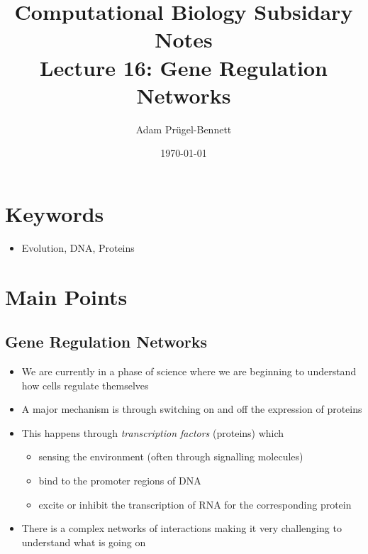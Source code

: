\documentclass[11pt]{article}
\author{Adam Prügel-Bennett}
\date{\today}
\title{Computational Biology Subsidary Notes\\\medskip
\large Lecture 16: Gene Regulation Networks}
\begin{document}
\maketitle

\section{Keywords}
\label{sec:org82530e7}
\begin{itemize}
\item Evolution, DNA, Proteins
\end{itemize}

\section{Main Points}
\label{sec:org8cab513}

\subsection{Gene Regulation Networks}
\label{sec:org61f900e}
\begin{itemize}
\item We are currently in a phase of science where we are beginning to
understand how cells regulate themselves
\item A major mechanism is through switching on and off the expression
of proteins
\item This happens through \emph{transcription factors} (proteins) which
\begin{itemize}
\item sensing the environment (often through signalling molecules)
\item bind to the promoter regions of DNA
\item excite or inhibit the transcription of RNA for the
corresponding protein
\end{itemize}
\item There is a complex networks of interactions making it very
challenging to understand what is going on
\end{itemize}
\end{document}
